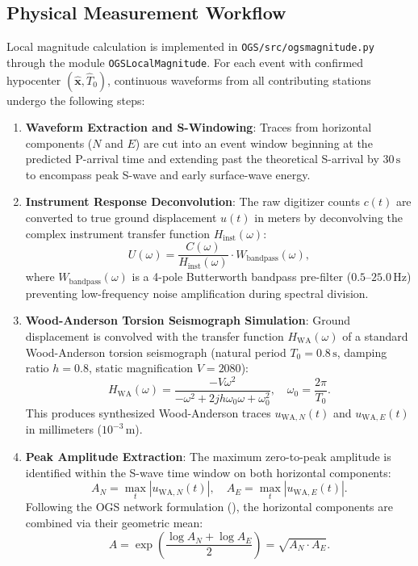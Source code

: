 \subsection{Physical Measurement Workflow}
Local magnitude calculation is implemented in \texttt{OGS/src/ogsmagnitude.py} through the module \texttt{OGSLocalMagnitude}. For each event with confirmed hypocenter $(\hat{\mathbf{x}}, \hat{T}_0)$, continuous waveforms from all contributing stations undergo the following steps:
\begin{enumerate}
  \item \textbf{Waveform Extraction and S-Windowing}: Traces from horizontal components ($N$ and $E$) are cut into an event window beginning at the predicted P-arrival time and extending past the theoretical S-arrival by $30\,\mathrm{s}$ to encompass peak S-wave and early surface-wave energy.
  \item \textbf{Instrument Response Deconvolution}: The raw digitizer counts $c(t)$ are converted to true ground displacement $u(t)$ in meters by deconvolving the complex instrument transfer function $H_{\mathrm{inst}}(\omega)$:
  \begin{equation}
    U(\omega) = \frac{C(\omega)}{H_{\mathrm{inst}}(\omega)} \cdot W_{\mathrm{bandpass}}(\omega),
  \end{equation}
  where $W_{\mathrm{bandpass}}(\omega)$ is a 4-pole Butterworth bandpass pre-filter ($0.5$--$25.0\,\mathrm{Hz}$) preventing low-frequency noise amplification during spectral division.
  \item \textbf{Wood-Anderson Torsion Seismograph Simulation}: Ground displacement is convolved with the transfer function $H_{\mathrm{WA}}(\omega)$ of a standard Wood-Anderson torsion seismograph (natural period $T_0 = 0.8\,\mathrm{s}$, damping ratio $h = 0.8$, static magnification $V = 2080$):
  \begin{equation}
    H_{\mathrm{WA}}(\omega) = \frac{-V \omega^2}{-\omega^2 + 2 j h \omega_0 \omega + \omega_0^2}, \quad \omega_0 = \frac{2\pi}{T_0}.
  \end{equation}
  This produces synthesized Wood-Anderson traces $u_{\mathrm{WA}, N}(t)$ and $u_{\mathrm{WA}, E}(t)$ in millimeters ($10^{-3}\,\mathrm{m}$).
  \item \textbf{Peak Amplitude Extraction}: The maximum zero-to-peak amplitude is identified within the S-wave time window on both horizontal components:
  \begin{equation}
    A_N = \max_{t} |u_{\mathrm{WA}, N}(t)|, \quad A_E = \max_{t} |u_{\mathrm{WA}, E}(t)|.
  \end{equation}
  Following the OGS network formulation (\cite{SMINO}), the horizontal components are combined via their geometric mean:
  \begin{equation}
    A = \exp\left( \frac{\log A_N + \log A_E}{2} \right) = \sqrt{A_N \cdot A_E}.
  \end{equation}
\end{enumerate}

